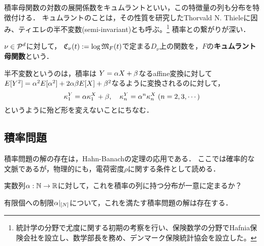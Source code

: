 \documentclass[uplatex,dvipdfmx]{jsreport}
\begin{document}
\begin{tcolorbox}[colframe=ForestGreen, colback=ForestGreen!10!white,breakable,colbacktitle=ForestGreen!40!white,coltitle=black,fonttitle=\bfseries\sffamily,
title=]
    積率母関数の対数の展開係数をキュムラントといい，この特徴量の列も分布を特徴付ける．
    キュムラントのことは，その性質を研究したThorvald N. Thieleに因み、ティエレの半不変数(semi-invariant)とも呼ぶ。\footnote{統計学の分野で尤度に関する初期の考察を行い、保険数学の分野でHafnia保険会社を設立し、数学部長を務め、デンマーク保険統計協会を設立した。}
    積率との繋がりが深い．
\end{tcolorbox}

\begin{definition}
    $\nu\in\P^d$に対して，
    $\fC_\nu(t):=\log\fM_F(t)$で定まる$D_\nu$上の関数を，$F$の\textbf{キュムラント母関数}という．
\end{definition}
\begin{remark}[affine変換に対する半不変性]
    半不変数というのは，積率は
    $Y=\al X+\beta$なるaffine変換に対して
    $E[Y^2]=\al^2 E[\al^2]+2\al\beta E[X]+\beta^2$なるように変換されるのに対して，
    \[\kappa_1^Y=\al\kappa_1^X+\beta,\quad\kappa_n^Y=\al^n\kappa_n^X\;(n=2,3,\cdots)\]
    というように殆ど形を変えないことにちなむ．
\end{remark}

\begin{example}
    
\end{example}

\subsection{積率問題}

\begin{tcolorbox}[colframe=ForestGreen, colback=ForestGreen!10!white,breakable,colbacktitle=ForestGreen!40!white,coltitle=black,fonttitle=\bfseries\sffamily,
title=]
    積率問題の解の存在は，Hahn-Banachの定理の応用である．
    ここでは確率的な文脈であるが，物理的にも，電荷密度$\rho$に関する条件として読める．
\end{tcolorbox}

\begin{problem}
    実数列$\al:\N\to\R$に対して，これを積率の列に持つ分布が一意に定まるか？
\end{problem}

\begin{proposition}
    有限個への制限$\al|_{[N]}$について，これを満たす積率問題の解は存在する．
\end{proposition}
\end{document}
